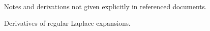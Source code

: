 \documentclass[a4paper,12pt]{article}
\begin{document}
Notes and derivations not given explicitly in referenced documents.

Derivatives of regular Laplace expansions.
\end{document}
